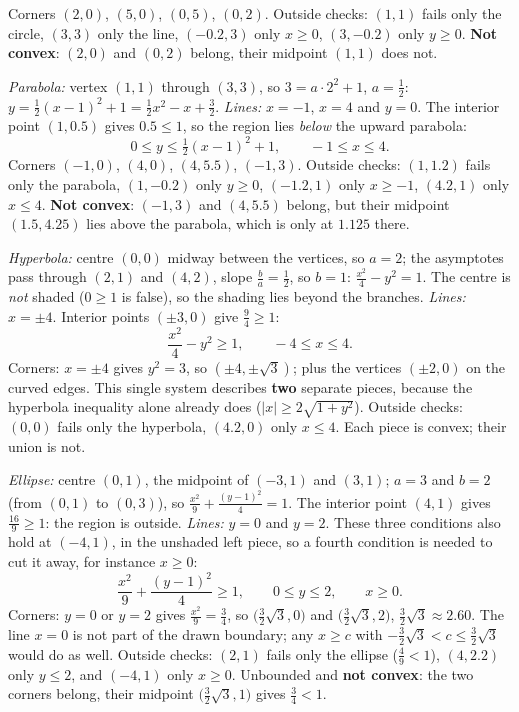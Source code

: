 \begin{solutions}[resume]
\[        \]
        Corners $(2,0)$, $(5,0)$, $(0,5)$, $(0,2)$. Outside checks:
        $(1,1)$ fails only the circle, $(3,3)$ only the line,
        $(-0.2,3)$ only $x\ge0$, $(3,-0.2)$ only $y\ge0$. \textbf{Not
        convex}: $(2,0)$ and $(0,2)$ belong, their midpoint $(1,1)$ does
        not.
  \item \emph{Parabola:} vertex $(1,1)$ through $(3,3)$, so
        $3=a\cdot2^{2}+1$, $a=\tfrac12$:
        $y=\tfrac12(x-1)^{2}+1=\tfrac12x^{2}-x+\tfrac32$. \emph{Lines:}
        $x=-1$, $x=4$ and $y=0$. The interior point $(1,0.5)$ gives
        $0.5\le1$, so the region lies \emph{below} the upward parabola:
        \[
          0\le y\le\tfrac12(x-1)^{2}+1,\qquad -1\le x\le4 .
        \]
        Corners $(-1,0)$, $(4,0)$, $(4,5.5)$, $(-1,3)$. Outside checks:
        $(1,1.2)$ fails only the parabola, $(1,-0.2)$ only $y\ge0$,
        $(-1.2,1)$ only $x\ge-1$, $(4.2,1)$ only $x\le4$. \textbf{Not
        convex}: $(-1,3)$ and $(4,5.5)$ belong, but their midpoint
        $(1.5,4.25)$ lies above the parabola, which is only at $1.125$
        there.
  \item \emph{Hyperbola:} centre $(0,0)$ midway between the vertices, so
        $a=2$; the asymptotes pass through $(2,1)$ and $(4,2)$, slope
        $\tfrac{b}{a}=\tfrac12$, so $b=1$:
        $\tfrac{x^{2}}{4}-y^{2}=1$. The centre is \emph{not} shaded
        ($0\ge1$ is false), so the shading lies beyond the branches.
        \emph{Lines:} $x=\pm4$. Interior points $(\pm3,0)$ give
        $\tfrac94\ge1$:
        \[
          \frac{x^{2}}{4}-y^{2}\ge1,\qquad -4\le x\le4 .
        \]
        Corners: $x=\pm4$ gives $y^{2}=3$, so $(\pm4,\pm\sqrt3)$; plus the
        vertices $(\pm2,0)$ on the curved edges. This single system
        describes \textbf{two} separate pieces, because the hyperbola
        inequality alone already does ($|x|\ge2\sqrt{1+y^{2}}$). Outside
        checks: $(0,0)$ fails only the hyperbola, $(4.2,0)$ only
        $x\le4$. Each piece is convex; their union is not.
  \item \emph{Ellipse:} centre $(0,1)$, the midpoint of $(-3,1)$ and
        $(3,1)$; $a=3$ and $b=2$ (from $(0,1)$ to $(0,3)$), so
        $\tfrac{x^{2}}{9}+\tfrac{(y-1)^{2}}{4}=1$. The interior point
        $(4,1)$ gives $\tfrac{16}{9}\ge1$: the region is outside.
        \emph{Lines:} $y=0$ and $y=2$. These three conditions also hold at
        $(-4,1)$, in the unshaded left piece, so a fourth condition is
        needed to cut it away, for instance $x\ge0$:
        \[
          \frac{x^{2}}{9}+\frac{(y-1)^{2}}{4}\ge1,\qquad 0\le y\le2,
          \qquad x\ge0 .
        \]
        Corners: $y=0$ or $y=2$ gives $\tfrac{x^{2}}{9}=\tfrac34$, so
        $\bigl(\tfrac32\sqrt3,0\bigr)$ and $\bigl(\tfrac32\sqrt3,2\bigr)$,
        $\tfrac32\sqrt3\approx2.60$. The line $x=0$ is not part of the
        drawn boundary; any $x\ge c$ with $-\tfrac32\sqrt3<c\le
        \tfrac32\sqrt3$ would do as well. Outside checks: $(2,1)$ fails
        only the ellipse ($\tfrac49<1$), $(4,2.2)$ only $y\le2$, and
        $(-4,1)$ only $x\ge0$. Unbounded and \textbf{not convex}: the two
        corners belong, their midpoint $\bigl(\tfrac32\sqrt3,1\bigr)$ gives
        $\tfrac34<1$.
\end{solutions}
